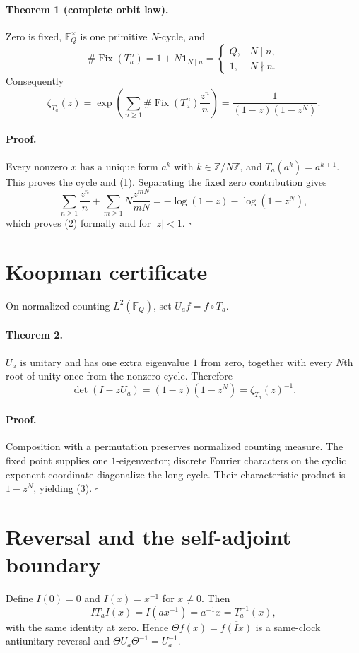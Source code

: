\documentclass[10pt]{article}
\begin{document}
\paragraph{Theorem 1 (complete orbit law).}
Zero is fixed, $\mathbb F_Q^\times$ is one primitive $N$-cycle, and
\[
 \#\operatorname{Fix}(T_a^n)=1+N\mathbf 1_{N\mid n}
 =\begin{cases}Q,&N\mid n,\\1,&N\nmid n.\end{cases}             \tag{1}
\]
Consequently
\[
 \zeta_{T_a}(z)=\exp\!\left(\sum_{n\geq1}
 \#\operatorname{Fix}(T_a^n)\frac{z^n}{n}\right)
 =\frac1{(1-z)(1-z^N)}.                                        \tag{2}
\]

\paragraph{Proof.}
Every nonzero $x$ has a unique form $a^k$ with $k\in\mathbb Z/N\mathbb Z$,
and $T_a(a^k)=a^{k+1}$.  This proves the cycle and (1).  Separating the fixed
zero contribution gives
\[
 \sum_{n\geq1}\frac{z^n}{n}+\sum_{m\geq1}N\frac{z^{mN}}{mN}
 =-\log(1-z)-\log(1-z^N),
\]
which proves (2) formally and for $|z|<1$. \hfill$\square$

\section{Koopman certificate}
On normalized counting $L^2(\mathbb F_Q)$, set $U_af=f\circ T_a$.

\paragraph{Theorem 2.}
$U_a$ is unitary and has one extra eigenvalue $1$ from zero, together with
every $N$th root of unity once from the nonzero cycle.  Therefore
\[
 \det(I-zU_a)=(1-z)(1-z^N)=\zeta_{T_a}(z)^{-1}.                 \tag{3}
\]

\paragraph{Proof.}
Composition with a permutation preserves normalized counting measure.  The
fixed point supplies one $1$-eigenvector; discrete Fourier characters on the
cyclic exponent coordinate diagonalize the long cycle.  Their characteristic
product is $1-z^N$, yielding (3). \hfill$\square$

\section{Reversal and the self-adjoint boundary}
Define $I(0)=0$ and $I(x)=x^{-1}$ for $x\ne0$.  Then
\[
 IT_aI(x)=I(ax^{-1})=a^{-1}x=T_a^{-1}(x),                       \tag{4}
\]
with the same identity at zero.  Hence
$\Theta f(x)=\overline{f(Ix)}$ is a same-clock antiunitary reversal and
$\Theta U_a\Theta^{-1}=U_a^{-1}$.
\end{document}

